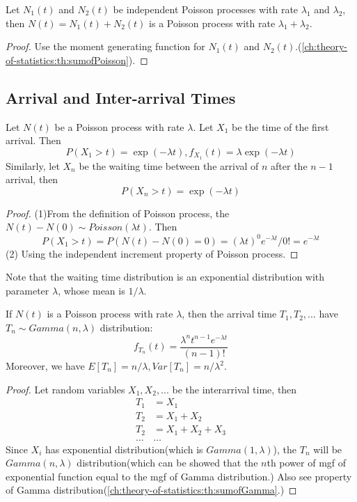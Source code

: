 \begin{refsection}
\begin{lemma}
	Let $N_1(t)$ and $N_2(t)$ be independent Poisson processes with rate $\lambda_1$ and $\lambda_2$, then
	$N(t) = N_1(t) + N_2(t)$ is a Poisson process with rate $\lambda_1 + \lambda_2$.
\end{lemma}
\begin{proof}
	Use the moment generating function for $N_1(t)$ and $N_2(t)$.(\autoref{ch:theory-of-statistics:th:sumofPoisson}).
\end{proof}

\subsection{Arrival and Inter-arrival Times}
\begin{lemma}
	Let $N(t)$ be a Poisson process with rate $\lambda$. Let $X_1$ be the time of the first arrival. Then 
	$$P(X_1 > t) = \exp(-\lambda t), f_{X_1}(t) = \lambda \exp(-\lambda t)$$
	Similarly, let $X_n$ be the waiting time between the arrival of $n$ after the $n-1$ arrival, then
	$$P(X_n > t) = \exp(-\lambda t)$$
\end{lemma}
\begin{proof}
	(1)From the definition of Poisson process, the $N(t)-N(0) \sim Poisson(\lambda t)$. Then
	$$P(X_1 > t) = P(N(t)-N(0) = 0 ) = (\lambda t)^0 e^{-\lambda t}/0! = e^{-\lambda t}$$
	(2) Using the independent increment property of Poisson process.
\end{proof}

\begin{remark}
	Note that the waiting time distribution is an exponential distribution with parameter $\lambda$, whose mean is $1/\lambda$.
\end{remark}


\begin{lemma}\label{ch:theory-of-stochastic-process:th:arrivaltimepoissonprocess}
	If $N(t)$ is a Poisson process with rate $\lambda$, then the arrival time $T_1,T_2,...$ have $T_n\sim Gamma(n,\lambda)$ distribution:
	$$f_{T_n}(t) = \frac{\lambda^nt^{n-1}e^{-\lambda t}}{(n-1)!}$$
	Moreover, we have $E[T_n] = n/\lambda, Var[T_n] = n/\lambda^2$.
\end{lemma}
\begin{proof}
	Let random variables $X_1,X_2,...$ be the interarrival time, then
	\begin{align*}
	T_1 &= X_1 \\
	T_2 & = X_1 +X_2\\
	T_2 & = X_1 +X_2 + X_3\\
	\dots & \dots
	\end{align*}
	Since $X_i$ has exponential distribution(which is $Gamma(1,\lambda)$), the $T_n$ will be $Gamma(n,\lambda)$ distribution(which can be showed that the $n$th power of mgf of exponential function equal to the mgf of Gamma distribution.) Also see property of Gamma distribution(\autoref{ch:theory-of-statistics:th:sumofGamma}.) 
\end{proof}





\end{refsection}
